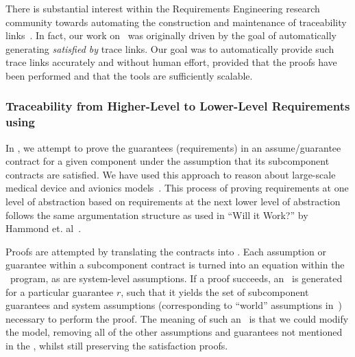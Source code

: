 There is substantial interest within the Requirements Engineering research community towards automating the construction and maintenance of traceability links~\cite{hayes2003improving, egyed2002automating,cleland2007best}.  In fact, our work on \mivcs\ was originally driven by the goal of automatically generating {\em satisfied by} trace links.  Our goal was to automatically provide such trace links accurately and without human effort, provided that the proofs have been performed and that the tools are sufficiently scalable.



\subsubsection{Traceability from Higher-Level to Lower-Level Requirements using \agree}
In \agree, we attempt to prove the guarantees (requirements) in an assume/guarantee contract for a given component under the assumption that its subcomponent contracts are satisfied.  We have used this approach to reason about large-scale medical device and avionics models~\cite{QFCS15:backes,hilt2013}.  This process of proving requirements at one level of abstraction based on requirements at the next lower level of abstraction follows the same argumentation structure as used in ``Will it Work?'' by Hammond et. al~\cite{Hammond01:WiW}.


Proofs are attempted by translating the contracts into \jkind.  Each assumption or guarantee within a subcomponent contract is turned into an equation within the \jkind\ program, as are system-level assumptions.  If a proof succeeds, an \mivc\ is generated for a particular guarantee $r$, such that it yields the set of subcomponent guarantees and system assumptions (corresponding to ``world'' assumptions in~\cite{zave1997four}) necessary to perform the proof.  The meaning of such an \mivc\ is that we could modify the model, removing all of the other assumptions and guarantees not mentioned in the \mivc, whilst still preserving the satisfaction proofs.

